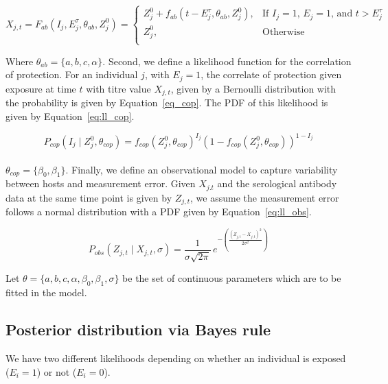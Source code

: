 \documentclass{article}
\begin{document}
\begin{equation}
\label{eq:ll_abkin}
X_{j,t}  = F_{ab}( I_j,  E_j^\tau, \theta_{ab}, Z^0_j) = 
	\begin{cases}
	Z^0_j + f_{ab}(t - E_j^\tau, \theta_{ab}, Z^0_j),  & \text{If $I_j = 1$, $E_j = 1$, and $t > E_j^\tau$} \\
	Z^0_j, & \text{Otherwise} \\ 
	\end{cases}
\end{equation}

Where $\theta_{ab} = \{a, b, c, \alpha\}$. Second, we define a likelihood function for the correlation of protection. For an individual $j$, with $E_j = 1$, the correlate of protection given exposure at time $t$ with titre value $X_{j, t}$, given by a Bernoulli distribution with the probability is given by Equation~\ref{eq_cop}. The PDF of this likelihood is given by Equation~\ref{eq:ll_cop}.

\begin{equation}
\label{eq:ll_cop}
P_{cop}(I_j \mid Z_{j}^0, \theta_{cop} ) =  f_{cop}(Z_{j}^0,  \theta_{cop})^{I_j}(1- f_{cop}(Z_{j}^0,  \theta_{cop} ))^{1-I_j}
\end{equation}

\paragraph{}$\theta_{cop} = \{\beta_0, \beta_1\}$. Finally, we define an observational model to capture variability between hosts and measurement error. Given $X_{j.t}$ and the serological antibody data at the same time point is given by $Z_{j, t}$, we assume the measurement error follows a normal distribution with a PDF given by Equation~\ref{eq:ll_obs}.

\begin{equation}
\label{eq:ll_obs}
P_{obs}(Z_{j,t} \mid X_{j,t}, \sigma) = \frac{1}{\sigma \sqrt{2\pi}} \, e^{-\left(\frac{(Z_{j,t} - X_{j,t})^2}{2\sigma^2}\right)}
\end{equation}

Let $\theta = \{a, b, c, \alpha, \beta_0, \beta_1, \sigma\}$ be the set of continuous parameters which are to be fitted in the model. 

\subsection{Posterior distribution via Bayes rule}

We have two different likelihoods depending on whether an individual is exposed ($E_i = 1$) or not ($E_i = 0$).
\end{document}
